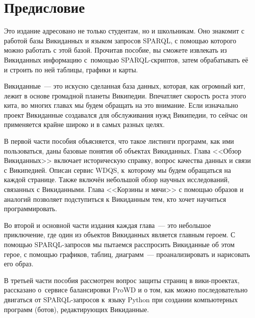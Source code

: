 \chapter*{Предисловие}
\label{ch:intro}

Это издание адресовано не только студентам, но и школьникам. 
Оно знакомит с работой базы Викиданных и языком запросов SPARQL, 
с помощью которого можно работать с этой базой. 
Прочитав пособие, вы сможете извлекать из Викиданных информацию с~помощью SPARQL-скриптов, 
затем обрабатывать её и строить по ней таблицы, графики и карты.

Викиданные~--- это искусно сделанная база данных, 
которая, как огромный кит, лежит в основе громадной планеты 
Википедии. Впечатляет скорость роста этого кита, во многих главах мы будем обращать на это внимание.
Если изначально проект Викиданные создавался для обслуживания нужд Википедии, 
то сейчас он применяется крайне широко и в самых разных целях.

В первой части пособия объясняется, 
что такое листинги программ, как ими пользоваться, даны базовые понятия об объектах Викиданных. 
Глава <<Обзор Викиданных>> включает историческую справку, 
вопрос качества данных и связи с Википедией. 
Описан сервис WDQS, к~которому мы будем обращаться на каждой странице. 
Также включён небольшой обзор научных исследований, связанных с Викиданными. 
Глава <<Корзины и мячи>> с помощью образов и аналогий позволяет подступиться к Викиданным тем, 
кто хочет научиться программировать. 


Во второй и основной части издания 
каждая глава~--- это небольшое приключение, 
где один из объектов Викиданных является главным героем. 
С помощью SPARQL-запросов мы пытаемся расспросить Викиданные об этом герое, 
с помощью графиков, таблиц, диаграмм~--- проанализировать и нарисовать его образ. 


В третьей части пособия %
рассмотрен вопрос защиты страниц в вики-проектах, 
рассказано о~сервисе балансировки ProWD и о том, 
как можно последовательно двигаться от SPARQL-запросов 
к~языку Python при создании компьютерных программ (ботов), редактирующих Викиданные. 


